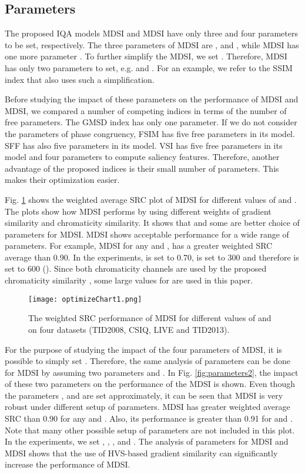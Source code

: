 \subsection{Parameters}
\label{parameters}

The proposed IQA models MDSI and MDSI have only three and four parameters to be set, respectively. The three parameters of MDSI are ,  and , while MDSI has one more parameter . To further simplify the MDSI, we set . Therefore, MDSI has only two parameters to set, e.g.  and . For an example, we refer to the SSIM index \cite{SSIM} that also uses such a simplification. 

Before studying the impact of these parameters on the performance of MDSI and MDSI, we compared a number of competing indices in terms of the number of free parameters. The GMSD index has only one parameter. If we do not consider the parameters of phase congruency, FSIM has five free parameters in its model. SFF has also five parameters in its model. VSI has five free parameters in its model and four parameters to compute saliency features. Therefore, another advantage of the proposed indices is their small number of parameters. This makes their optimization easier. 

Fig. \ref{fig:parameters1} shows the weighted average SRC plot of MDSI for different values of  and . The plots show how MDSI performs by using different weights of gradient similarity and chromaticity similarity. It shows that  and some  are better choice of parameters for MDSI. MDSI shows acceptable performance for a wide range of parameters. For example, MDSI for any  and , has a greater weighted SRC average than 0.90. In the experiments,  is set to 0.70,  is set to 300 and therefore  is set to 600 (). Since both chromaticity channels are used by the proposed chromaticity similarity , some large values for  are used in this paper.      

\begin{figure}[htb]
\scriptsize
\begin{minipage}[b]{0.99\linewidth}
  \centering
  \centerline{\texttt{[image: optimizeChart1.png]}} 
\end{minipage}
\caption{The weighted SRC performance of MDSI for different values of  and  on four datasets (TID2008, CSIQ, LIVE and TID2013).}
\label{fig:parameters1}
\end{figure}


For the purpose of studying the impact of the four parameters of MDSI, it is possible to simply set . Therefore, the same analysis of parameters can be done for MDSI by assuming two parameters  and . In Fig. \ref{fig:parameters2}, the impact of these two parameters on the performance of the MDSI is shown. Even though the parameters ,  and  are set approximately, it can be seen that MDSI is very robust under different setup of parameters. MDSI has greater weighted average SRC than 0.90 for any  and . Also, its performance is greater than 0.91 for  and . Note that many other possible setup of parameters are not included in this plot. In the experiments, we set , , , and . The analysis of parameters for MDSI and MDSI shows that the use of HVS-based gradient similarity can significantly increase the performance of MDSI. 

